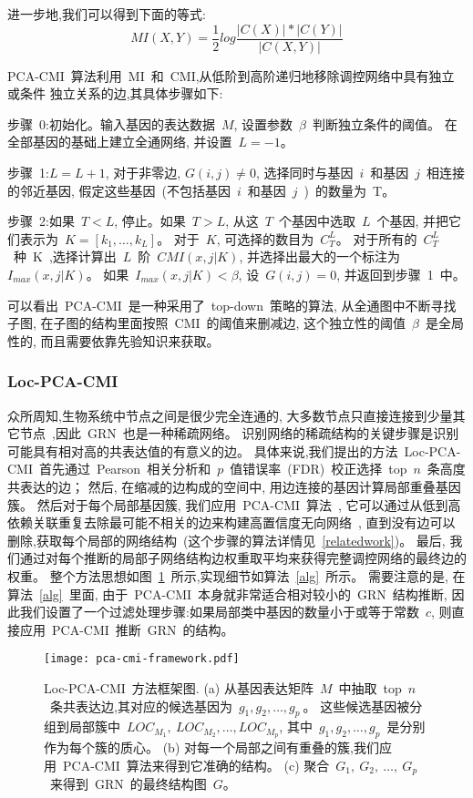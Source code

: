 进一步地,我们可以得到下面的等式:
\begin{equation}
    MI(X,Y)=\frac{1}{2}log\frac{|C(X)|*|C(Y)|}{|C(X,Y)|}
\end{equation}

PCA-CMI~算法利用~MI~和~CMI,从低阶到高阶递归地移除调控网络中具有独立或条件
独立关系的边,其具体步骤如下:

步骤~0:初始化。输入基因的表达数据~$M$, 设置参数~$\beta$~判断独立条件的阈值。
在全部基因的基础上建立全通网络, 并设置~$L=-1$。

步骤~1:$L=L+1$, 对于非零边, $G(i,j) \neq 0$, 选择同时与基因~$i$~和基因~$j$~相连接的邻近基因, 
假定这些基因~(不包括基因~$i$~和基因~$j$~)~的数量为~T。

步骤~2:如果~$T<L$, 停止。如果~$T>L$, 从这~$T$~个基因中选取~$L$~个基因, 
并把它们表示为~$K=[k_1,\ldots,k_L]$。
对于~$K$, 可选择的数目为~$C_T^L$。
对于所有的~$C_T^L$~种~K~,选择计算出~$L$~阶~$CMI(x,j|K)$,
并选择出最大的一个标注为~$I_{max}(x,j|K)$。
如果~$I_{max}(x,j|K) < \beta$, 设~$G(i,j)=0$, 并返回到步骤~1~中。

可以看出~PCA-CMI~是一种采用了~top-down~策略的算法, 
从全通图中不断寻找子图, 在子图的结构里面按照~CMI~的阈值来删减边, 这个独立性的阈值~$\beta$~是全局性的, 
而且需要依靠先验知识来获取。


\subsubsection{Loc-PCA-CMI}
众所周知,生物系统中节点之间是很少完全连通的,
大多数节点只直接连接到少量其它节点~\cite{jeong2000large},因此~GRN~也是一种稀疏网络。
识别网络的稀疏结构的关键步骤是识别可能具有相对高的共表达值的有意义的边。
具体来说,我们提出的方法~Loc-PCA-CMI~首先通过~Pearson~相关分析和~$p$~值错误率~(FDR)~校正选择~top~$n$~条高度共表达的边；
然后, 在缩减的边构成的空间中, 用边连接的基因计算局部重叠基因簇。
然后对于每个局部基因簇, 我们应用~PCA-CMI~算法~\cite{zhang2011inferring},
它可以通过从低到高依赖关联重复去除最可能不相关的边来构建高置信度无向网络~\cite{spirtes2000causation},
直到没有边可以删除,获取每个局部的网络结构~(这个步骤的算法详情见~\ref{relatedwork})。
最后, 我们通过对每个推断的局部子网络结构边权重取平均来获得完整调控网络的最终边的权重。
整个方法思想如图~\ref{pca-cmi-fr}~所示,实现细节如算法~\ref{alg}~所示。
需要注意的是,
在算法~\ref{alg}~里面,
由于~PCA-CMI~本身就非常适合相对较小的~GRN~结构推断,
因此我们设置了一个过滤处理步骤:如果局部类中基因的数量小于或等于常数~$c$,
则直接应用~PCA-CMI~推断~GRN~的结构。
\begin{figure}[!htbp]
    \centering
    \texttt{[image: pca-cmi-framework.pdf]}
    \caption{Loc-PCA-CMI~方法框架图.
    (a) 从基因表达矩阵~$M$~中抽取~top~$n$~条共表达边,其对应的候选基因为~$g_1,g_2,\ldots,g_{p}~$。
    这些候选基因被分组到局部簇中~$LOC_{M_1},~LOC_{M_2},\ldots,LOC_{M_{p}}$,
    其中~$g_1,g_2,\ldots,g_{p}$~是分别作为每个簇的质心。
    (b) 对每一个局部之间有重叠的簇,我们应用~PCA-CMI~算法来得到它准确的结构。
    (c) 聚合~$G_1,~G_2,~\ldots,~G_p$~来得到~GRN~的最终结构图~$G$。
    }
    \label{pca-cmi-fr}
\end{figure}

